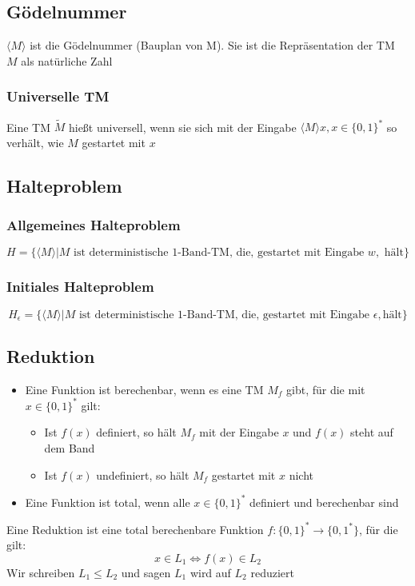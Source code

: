 \documentclass{article}
\begin{document}
\subsection{Gödelnummer}
$\langle M\rangle$ ist die Gödelnummer (Bauplan von M). Sie ist die Repräsentation der TM $M$ als natürliche Zahl
\subsubsection{Universelle TM}
Eine TM $\tilde{M}$ hießt universell, wenn sie sich mit der Eingabe $\langle M \rangle x, x\in\{0, 1\}^*$ so verhält, wie $M$ gestartet mit $x$
\subsection{Halteproblem}
\subsubsection{Allgemeines Halteproblem}
$$
	H=\{\langle M\rangle|M \text{ ist deterministische 1-Band-TM, die, gestartet mit Eingabe } w, \text{ hält} \}
$$
\subsubsection{Initiales Halteproblem}
$$
	H_\epsilon=\{\langle M\rangle | M \text{ ist deterministische 1-Band-TM, die, gestartet mit Eingabe }\epsilon, \text{hält}\}
$$
\subsection{Reduktion}
\begin{itemize}
	\item Eine Funktion ist berechenbar, wenn es eine TM $M_f$ gibt, für die mit $x\in\{0,1\}^*$ gilt:
		\begin{itemize}
			\item Ist $f(x)$ definiert, so hält $M_f$ mit der Eingabe $x$ und $f(x)$ steht auf dem Band
			\item Ist $f(x)$ undefiniert, so hält $M_f$ gestartet mit $x$ nicht
		\end{itemize}
	\item Eine Funktion ist total, wenn alle $x\in\{0,1\}^*$ definiert und berechenbar sind 
\end{itemize}
Eine Reduktion ist eine total berechenbare Funktion $f:\{0,1\}^*\to\{0,1^*\}$, für die gilt:
$$
	x\in L_1 \Leftrightarrow f(x)\in L_2
$$ 
Wir schreiben \glqq{}$L_1\leq L_2$\grqq{} und sagen \glqq{} $L_1$ wird auf $L_2$ reduziert\glqq{}
\end{document}
